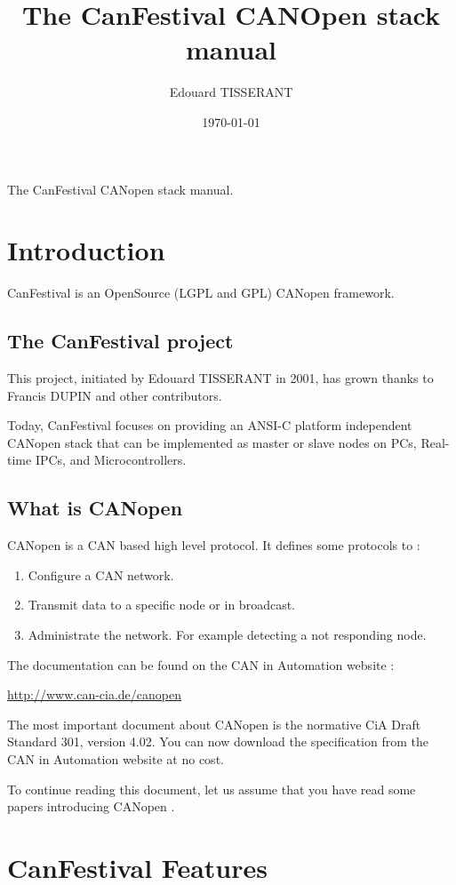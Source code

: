\documentclass[12pt,english,a4paper]{book}
\title{\Huge The CanFestival CANOpen stack manual}
\author{Edouard TISSERANT}
\date{\today}
\newcommand{\canopen}{CANopen }
\begin{document}
{\centering\textsf{\huge The CanFestival \canopen stack manual.}}

\renewcommand{\contentsname}{CanFestival v3.0 Manual}
\setcounter{tocdepth}{2} \tableofcontents{}

\clearpage{}

\section{Introduction}

CanFestival is an OpenSource (LGPL and GPL) \canopen framework.

\subsection{The CanFestival project}

This project, initiated by Edouard TISSERANT in 2001, has grown thanks
to Francis DUPIN and other contributors.

Today, CanFestival focuses on providing an ANSI-C platform independent
\canopen stack that can be implemented as master or slave nodes on
PCs, Real-time IPCs, and Microcontrollers.


\subsection{What is \canopen}

CANopen is a CAN based high level protocol. It defines some protocols
to :

\begin{enumerate}
\item Configure a CAN network. 
\item Transmit data to a specific node or in broadcast. 
\item Administrate the network. For example detecting a not responding node. 
\end{enumerate}
The documentation can be found on the CAN in Automation website :

\href{http://www.can-cia.de/canopen}{http://www.can-cia.de/canopen}

The most important document about \canopen is the normative CiA Draft
Standard 301, version 4.02. You can now download the specification
from the CAN in Automation website at no cost.

To continue reading this document, let us assume that you have read
some papers introducing \canopen .


\section{CanFestival Features}
\end{document}
